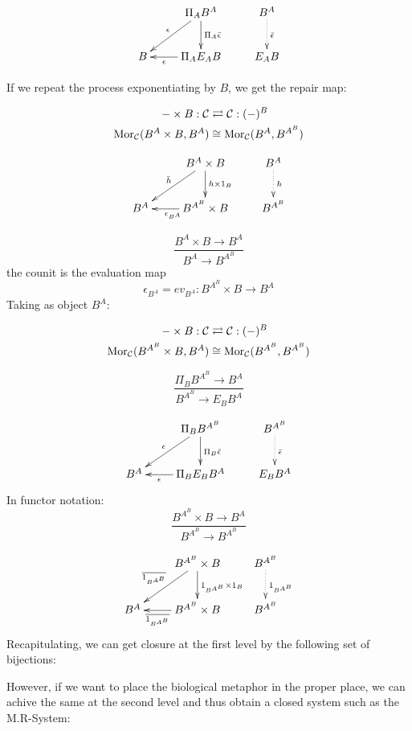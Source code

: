 \documentclass[aps,twocolumn]{revtex4-1}
\begin{document}
			$$
			\xymatrix{
			& \Pi_A B^A \ar[d]^{\Pi_A \bar{\epsilon}} \ar[dl]_{\epsilon} & B^A \ar@{.>}[d]^{\bar{\epsilon}}\\
			B & \Pi_A E_A B \ar[l]^-{\epsilon} & E_A B}
			$$
	
If we repeat the process exponentiating by $B$, we get the repair map:	
	
\begin{align*}
- \times B: \mathcal{C} & \rightleftarrows \mathcal{C}: (-)^B\\
\mathop{\rm Mor}\nolimits_{\mathcal{C}}(B^A \times B, B^A) & \cong  \mathop{\rm Mor}\nolimits_{\mathcal{C}}(B^A, B^{A^B})
\end{align*}

			$$ \xymatrix{
			& B^A \times B \ar[d]^-{h \times 1_B} \ar[dl]_{\bar{h}} & B^A \ar@{.>}[d]^-{h}\\
			B^A & B^{A^B} \times B \ar[l]^{\epsilon_{B^A}} & B^{A^B}}
			$$
		
		$$
			\frac{B^A \times B \longrightarrow B^A}{B^A \longrightarrow B^{A^B}}
		$$
		the counit is the evaluation map
		$$
			\epsilon_{B^A} = ev_{B^A} \colon B^{A^B} \times B \longrightarrow B^A
		$$
Taking as object $B^A$:

\begin{align*}
- \times B: \mathcal{C} & \rightleftarrows \mathcal{C}: (-)^B\\
\mathop{\rm Mor}\nolimits_{\mathcal{C}}(B^{A^B} \times B, B^A) & \cong  \mathop{\rm Mor}\nolimits_{\mathcal{C}}(B^{A^B}, B^{A^B})
\end{align*}

		$$
			\frac{ \Pi_B B^{A^B} \longrightarrow B^A}{B^{A^B} \longrightarrow E_B B^A}
		$$

			$$
			\xymatrix{
			& \Pi_B B^{A^B} \ar[d]^{\Pi_B \bar{\epsilon}} \ar[dl]_{\epsilon} & B^{A^B} \ar@{.>}[d]^{\bar{\epsilon}}\\
			B^A & \Pi_B E_B B^A \ar[l]^-{\epsilon} & E_B B^A}
			$$
In functor notation:
		$$
			\frac{B^{A^B} \times B \longrightarrow B^A}{B^{A^B} \longrightarrow B^{A^B}}
		$$

			$$
			\xymatrix{
			& B^{A^B} \times B \ar[d]^{1_{B^{A^B}} \times 1_B} \ar[dl]_{\overline{1_{B^{A^B}}}} & B^{A^B} \ar@{.>}[d]^{1_{B^{A^B}}}\\
			B^A & B^{A^B} \times B \ar[l]^-{\overline{1_{B^{A^B}}}} & B^{A^B}}
			$$
Recapitulating, we can get closure at the first level by the following set of bijections:
			
						\begin{prooftree}
				\end{prooftree}
However, if we want to place the biological metaphor in the proper place, we can achive the same at the second level and thus obtain a closed system such as the M.R-System:
			
\end{document}
